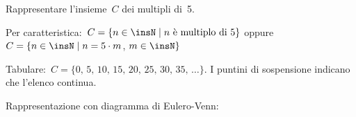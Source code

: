 \begin{exrig}
 \begin{esempio}
 Rappresentare l'insieme~$C$ dei multipli di~5.

 Per caratteristica:~$C=\{n\in\insN\mid n\text{ è multiplo di }5\}$ oppure
$C=\{n\in\insN\mid n=5\cdot m$, $m\in\insN\}$

Tabulare:~$C=\{\text{0, 5, 10, 15, 20, 25, 30, 35, }\dots\}$. I puntini di sospensione indicano che l'elenco continua.

Rappresentazione con diagramma di Eulero-Venn:
\begin{center}
 
\end{center}
 \end{esempio}
\end{exrig}

\ovalbox{\risolvii \ref{ese:6.21}, \ref{ese:6.22}}

\newpage

\cleardoublepage
